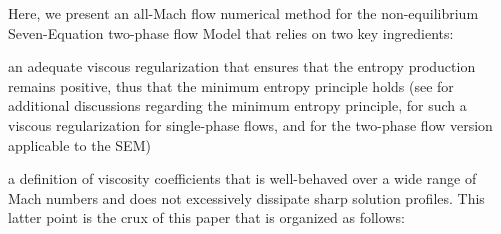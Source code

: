 \documentclass[preprint,10pt]{elsarticle}
\begin{document}
Here, we present an all-Mach flow numerical method for the non-equilibrium Seven-Equation two-phase flow Model  that relies on two key ingredients:
\ben
\item  an adequate viscous regularization that ensures that the entropy production remains positive, thus that the minimum entropy principle holds 
(see \cite{tadmor_minimum_entropy_principle} for additional discussions regarding the minimum entropy principle, \cite{GuermondSIAM2014}
for such a viscous regularization for single-phase flows, and \cite{Marco_paper_sem} for the two-phase flow version applicable to the SEM)
\item a definition of viscosity coefficients that is well-behaved over a wide range of Mach numbers and does not excessively dissipate sharp solution profiles. 
\een
This latter point is the crux of this paper that is organized as follows:
%
\end{document}
